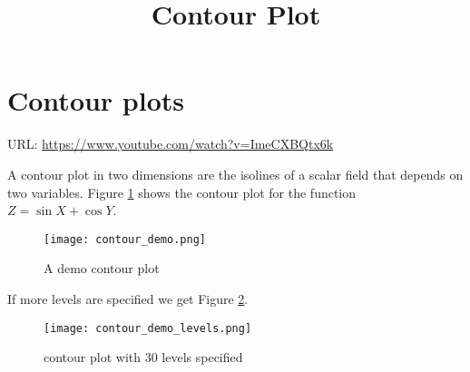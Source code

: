 \documentclass{../template/texnote}
\title{Contour Plot}
\begin{document}
    \maketitle {}

\section{Contour plots}
URL: \url{https://www.youtube.com/watch?v=ImeCXBQtx6k}

A contour plot in two dimensions are the isolines of a scalar field that depends on two variables.
Figure \ref{fig:contour_demo} shows the contour plot for the function
$Z = \sin{X} + \cos{Y}$.
\begin{figure}
\begin{center}
    \texttt{[image: contour\_demo.png]}
\end{center}
\caption{A demo contour plot}
\label{fig:contour_demo}
\end{figure}
If more levels are specified we get Figure \ref{fig:contour_levels}.
\begin{figure}
\begin{center}
    \texttt{[image: contour\_demo\_levels.png]}
\end{center}
\caption{contour plot with 30 levels specified}
\label{fig:contour_levels}
\end{figure}


    \printbibliography
\end{document}
